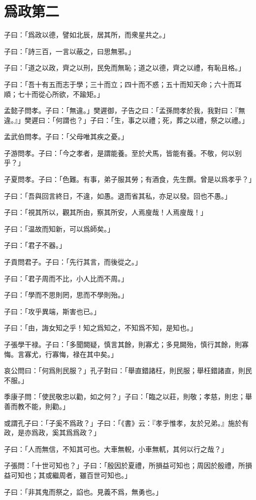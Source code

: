 \section[爲政第二]{爲政第二}

子曰：「爲政以德，譬如北辰，居其所，而衆星共之。」

子曰：「詩三百，一言以蔽之，曰思無邪。」

子曰：「道之以政，齊之以刑，民免而無恥；道之以德，齊之以禮，有恥且格。」

子曰：「吾十有五而志于學；三十而立；四十而不惑；五十而知天命；六十而耳順；七十而從心所欲，不踰矩。」

孟懿子問孝。子曰：「無違。」樊遲御，子告之曰：「孟孫問孝於我，我對曰：『無違。』」樊遲曰：「何謂也？」子曰：「生，事之以禮；死，葬之以禮，祭之以禮。」

孟武伯問孝。子曰：「父母唯其疾之憂。」

子游問孝。子曰：「今之孝者，是謂能養。至於犬馬，皆能有養。不敬，何以别乎？」

子夏問孝。子曰：「色難。有事，弟子服其勞；有酒食，先生饌。曾是以爲孝乎？」

子曰：「吾與回言終日，不違，如愚。退而省其私，亦足以發。回也不愚。」

子曰：「視其所以，觀其所由，察其所安，人焉廋哉！人焉廋哉！」

子曰：「温故而知新，可以爲師矣。」

子曰：「君子不器。」

子貢問君子。子曰：「先行其言，而後從之。」

子曰：「君子周而不比，小人比而不周。」

子曰：「學而不思則罔，思而不學則殆。」

子曰：「攻乎異端，斯害也已。」

子曰：「由，誨女知之乎！知之爲知之，不知爲不知，是知也。」

子張學干禄。子曰：「多聞闕疑，慎言其餘，則寡尤；多見闕殆，慎行其餘，則寡悔。言寡尤，行寡悔，禄在其中矣。」

哀公問曰：「何爲則民服？」孔子對曰：「舉直錯諸枉，則民服；舉枉錯諸直，則民不服。」

季康子問：「使民敬忠以勸，如之何？」子曰：「臨之以莊，則敬；孝慈，則忠；舉善而教不能，則勸。」

或謂孔子曰：「子奚不爲政？」子曰：「《書》云：『孝乎惟孝，友於兄弟。』施於有政，是亦爲政，奚其爲爲政？」

子曰：「人而無信，不知其可也。大車無輗，小車無軏，其何以行之哉？」

子張問：「十世可知也？」子曰：「殷因於夏禮，所損益可知也；周因於殷禮，所損益可知也；其或繼周者，雖百世可知也。」

子曰：「非其鬼而祭之，諂也。見義不爲，無勇也。」
